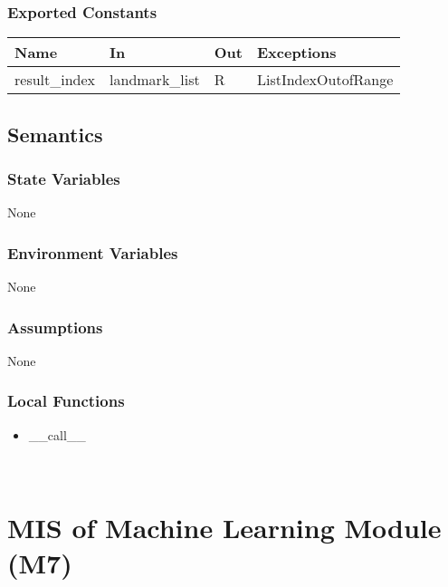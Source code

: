 \documentclass[12pt, titlepage]{article}
\begin{document}
\subsubsection{Exported Constants}

\begin{center}
\begin{tabular}{p{3cm} p{3cm} p{2cm} p{4cm}}
\hline
\textbf{Name} & \textbf{In} & \textbf{Out} & \textbf{Exceptions} \\
\hline
result_index & landmark_list & R & ListIndexOutofRange \\
\hline
\end{tabular}
\end{center}

\subsection{Semantics}

\subsubsection{State Variables}

None\\

\subsubsection{Environment Variables}

None\\

\subsubsection{Assumptions}

None\\

\subsubsection{Local Functions}
\begin{itemize}
\item \_\_call\_\_
\end{itemize}

~\newpage

\section{MIS of Machine Learning Module (M7)} \label{M7}
\end{document}
